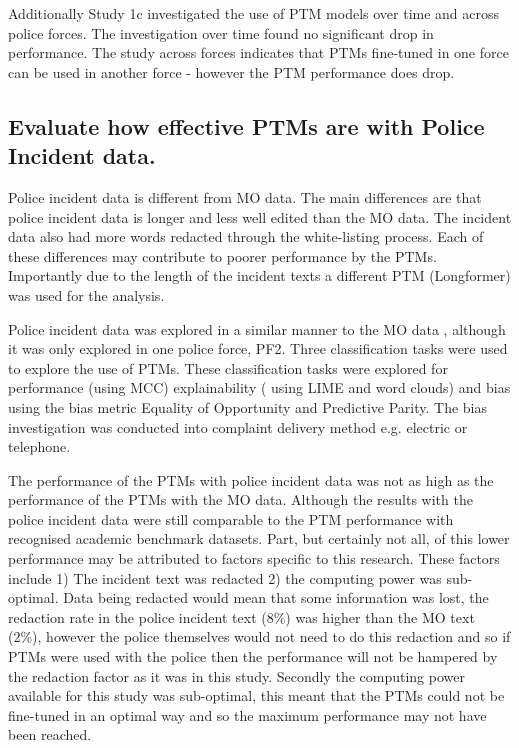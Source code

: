 Additionally Study 1c investigated the use of PTM models over time and across police forces. The investigation over time found no significant drop in performance. The study across forces indicates that PTMs fine-tuned in one force can be used in another force - however the PTM performance does drop. 
 
 
\subsection{Evaluate how effective PTMs are with Police Incident data.} Police incident data is different from MO data. The main differences are that police incident data is longer and less well edited than the MO data. The incident data also had more words redacted through the white-listing process. Each of these differences may contribute to poorer performance by the PTMs. Importantly due to the length of the incident texts a different PTM (Longformer) was used for the analysis.

Police incident data was explored in a similar manner to the MO data , although it was only explored in one police force, PF2. Three classification tasks were used to explore the use of PTMs. These classification tasks were explored for performance (using MCC) explainability ( using LIME and word clouds) and bias using the bias metric Equality of Opportunity and Predictive Parity. The bias investigation was conducted into complaint delivery method e.g. electric or telephone.

The performance of the PTMs with police incident data was not as high as the performance of the PTMs with the MO data. Although the results with the police incident data were still comparable to the PTM performance with recognised academic benchmark datasets. Part, but certainly not all,  of this lower performance may be attributed to factors specific to this research. These factors include 1) The incident text was redacted 2) the computing power was sub-optimal. Data being redacted would mean that some information was lost, the redaction rate in the police incident text (8\%)  was higher than the MO text (2\%), however the police themselves would not need to do this redaction and so if PTMs were used with the police then the performance will not be hampered by the redaction factor as it was in this study. Secondly the computing power available for this study was sub-optimal, this meant that the PTMs could not be fine-tuned in an optimal way and so the maximum performance may not have been reached. 

